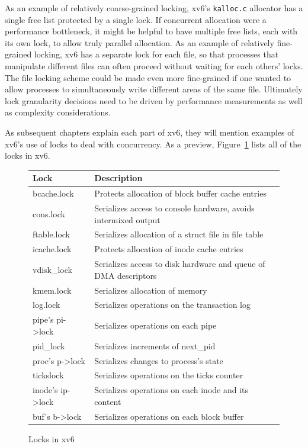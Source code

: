 As an example of relatively coarse-grained locking, xv6's
\lstinline{kalloc.c}
allocator has a single free list protected by a single
lock. If concurrent allocation were a performance bottleneck,
it might be helpful to have multiple free lists, each with
its own lock, to allow truly parallel allocation.
As an example of relatively fine-grained locking, xv6
has a separate lock for each file, so that processes that
manipulate different files can often proceed without waiting
for each others' locks. The file locking
scheme could be made even more fine-grained if one wanted
to allow processes to simultaneously
write different areas of the same file.
Ultimately lock granularity decisions need to be driven
by performance measurements as well as complexity considerations.

As subsequent chapters explain each part of xv6, they
will mention examples of xv6's use of locks
to deal with concurrency.
As a preview,
Figure~\ref{fig:locktable}
lists all of the locks in xv6.

\begin{figure}[t]
\center
\begin{tabular}{ll}
{\bf Lock} & {\bf Description} \\
\midrule
bcache.lock & Protects allocation of block buffer cache entries \\
cons.lock & Serializes access to console hardware, avoids intermixed output \\
ftable.lock & Serializes allocation of a struct file in file table \\
icache.lock & Protects allocation of inode cache entries \\
vdisk\_lock & Serializes access to disk hardware and queue of DMA descriptors \\
kmem.lock & Serializes allocation of memory \\
log.lock & Serializes operations on the transaction log \\
pipe's pi->lock & Serializes operations on each pipe \\
pid\_lock & Serializes increments of next\_pid \\
proc's p->lock & Serializes changes to process's state \\
tickslock & Serializes operations on the ticks counter \\
inode's ip->lock & Serializes operations on each inode and its content \\
buf's b->lock & Serializes operations on each block buffer \\
\end{tabular}
\caption{Locks in xv6}
\label{fig:locktable}
\end{figure}

